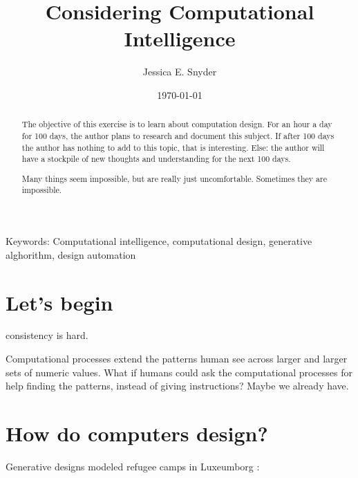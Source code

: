 \documentclass[a4paper,11pt]{article}
\begin{document}
\title{Considering Computational Intelligence}
\author{Jessica E. Snyder}
\date{\today}
\maketitle

\begin{abstract}
The objective of this exercise is to learn about computation design. For an hour a day for 100 days, the author plans to research and document this subject. If after 100 days the author has nothing to add to this topic, that is interesting. Else: the author will have a stockpile of new thoughts and understanding for the next 100 days.

Many things seem impossible, but are really just uncomfortable. Sometimes they are impossible. 

\end{abstract}

Keywords: Computational intelligence, computational design, generative alghorithm, design automation

\tableofcontents

\section{Let's begin}
consistency is hard. 

Computational processes extend the patterns human see across larger and larger sets of numeric values. What if humans could ask the computational processes for help finding the patterns, instead of giving instructions? Maybe we already have.

\section{How do computers design?}

Generative designs modeled refugee camps in Luxeumborg \cite{daher2017data}:
\end{document}

